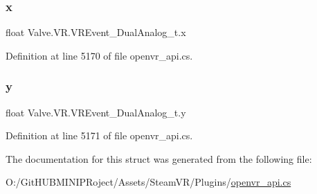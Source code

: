 \subsubsection{\texorpdfstring{x}{x}}
{\footnotesize\ttfamily float Valve.\+V\+R.\+V\+R\+Event\+\_\+\+Dual\+Analog\+\_\+t.\+x}



Definition at line 5170 of file openvr\+\_\+api.\+cs.

\mbox{\label{struct_valve_1_1_v_r_1_1_v_r_event___dual_analog__t_a06fb4b0df215b4201e69f1c75b8d3f27}} 
\subsubsection{\texorpdfstring{y}{y}}
{\footnotesize\ttfamily float Valve.\+V\+R.\+V\+R\+Event\+\_\+\+Dual\+Analog\+\_\+t.\+y}



Definition at line 5171 of file openvr\+\_\+api.\+cs.



The documentation for this struct was generated from the following file\+:\begin{DoxyCompactItemize}
\item 
O\+:/\+Git\+H\+U\+B\+M\+I\+N\+I\+P\+Roject/\+Assets/\+Steam\+V\+R/\+Plugins/\mbox{\hyperlink{openvr__api_8cs}{openvr\+\_\+api.\+cs}}\end{DoxyCompactItemize}
